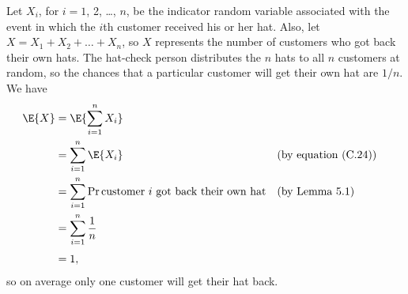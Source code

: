 Let $X_i$, for $i=1$, 2, \dots, $n$, be the indicator random variable associated with the event in which the $i$th customer received his or her hat.
Also, let $X=X_1+X_2+\dots+X_n$, so $X$ represents the number of customers who got back their own hats.
The hat-check person distributes the $n$ hats to all $n$ customers at random, so the chances that a particular customer will get their own hat are $1/n$.
We have
\begin{align*}
    \E{X} &= \E{\sum_{i=1}^nX_i} \\
    &= \sum_{i=1}^n\E{X_i} && \text{(by equation (C.24))} \\
    &= \sum_{i=1}^n\Pr{\text{customer $i$ got back their own hat}} && \text{(by Lemma 5.1)} \\
    &= \sum_{i=1}^n\frac{1}{n} \\[1mm]
    &= 1,
\end{align*}
so on average only one customer will get their hat back.
